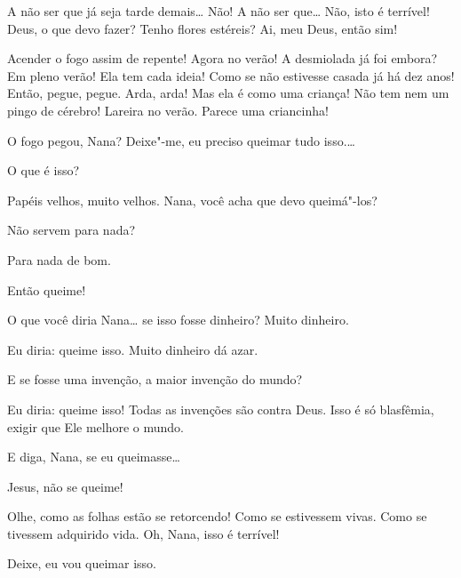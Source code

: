   A não ser que já seja tarde demais\ldots{} 
Não! A não ser que\ldots{} Não, isto é terrível! Deus, o que
devo fazer?  Tenho flores estéreis?
 Ai, meu Deus, então sim!


  Acender o fogo assim de repente!
Agora no verão! A desmiolada já foi embora?  Em pleno verão! Ela tem cada ideia! Como se não estivesse casada
já há dez anos! Então, pegue, pegue.  Arda, arda!
 Mas ela é como uma criança!  Não
tem nem um pingo de cérebro! Lareira no verão. 
Parece uma criancinha! 

 
O fogo pegou, Nana? Deixe"-me, eu preciso queimar tudo isso.\ldots{}

  O que é isso?

 Papéis velhos, muito velhos. Nana, você acha que devo queimá"-los?

 Não servem para nada?

 Para nada de bom.

 Então queime!

  O que você diria Nana\ldots{} se
isso fosse dinheiro? Muito dinheiro.

 Eu diria: queime isso. Muito dinheiro dá azar.

  E se fosse uma invenção, a maior
invenção do mundo?

 Eu diria: queime isso! Todas as invenções são contra Deus. Isso é só
blasfêmia, exigir que Ele melhore o mundo.

  E diga, Nana, se eu queimasse\ldots{}

 Jesus, não se queime!

 Olhe, como as folhas estão se retorcendo! Como se estivessem vivas. Como
se tivessem adquirido vida. Oh, Nana, isso é terrível!

 Deixe, eu vou queimar isso.


